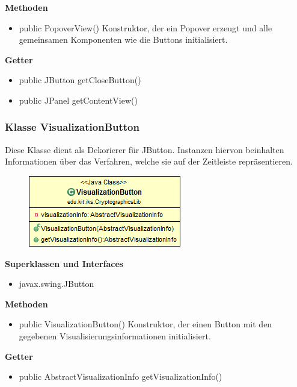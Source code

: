 \documentclass{article}
\begin{document}
      \textbf{Methoden}
      \begin{itemize}
        \item public PopoverView() \newline
          Konstruktor, der ein Popover erzeugt und alle gemeinsamen Komponenten wie
          die Buttons initialisiert.
      \end{itemize}
      
      \textbf{Getter}
      \begin{itemize}
		\item public JButton getCloseButton()
		\item public JPanel getContentView()
      \end{itemize}      
	
	\subsubsection{Klasse VisualizationButton}
	  Diese Klasse dient als Dekorierer für JButton. Instanzen hiervon beinhalten Informationen über das Verfahren, welche sie auf der Zeitleiste repräsentieren.
	
      \begin{figure}[H]
        \centering
        \includegraphics{resources/edu-kit-iks-CryptographicsLib-VisualizationButton}
      \end{figure}
	
      \textbf{Superklassen und Interfaces}
      \begin{itemize}
        \item javax.swing.JButton
      \end{itemize}
	
      \textbf{Methoden}
      \begin{itemize}
        \item public VisualizationButton() \newline
          Konstruktor, der einen Button mit den gegebenen Visualisierungsinformationen initialisiert.
      \end{itemize}
      
      \textbf{Getter}
      \begin{itemize}
		\item public AbstractVisualizationInfo getVisualizationInfo()
      \end{itemize}
	
\end{document}
